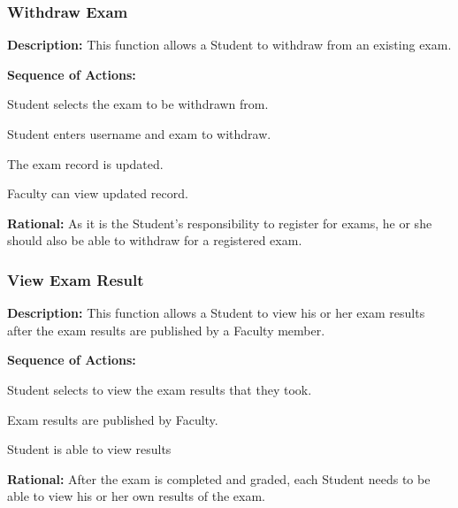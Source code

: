    \subsubsection{\large Withdraw Exam} 
   \begin{boxed} %
      \textbf{Description:}
      {\small This function allows a Student to withdraw from an existing exam.}
         
         \textbf{Sequence of Actions:}
         \begin{enumerate}
               {\small
            \item Student selects the exam to be withdrawn from.
            \item Student enters username and exam to withdraw.
            \item The exam record is updated.
            \item Faculty can view updated record.}
         \end{enumerate}

         \textbf{Rational:}
         {\small As it is the Student's responsibility to register for exams, he or she
         should also be able to withdraw for a registered exam.}
   \end{boxed} %

   \subsubsection{\large View Exam Result} 
   \begin{boxed} %
      \textbf{Description:}
      {\small This function allows a Student to view his or her exam results after
      the exam results are published by a Faculty member.}
         
         \textbf{Sequence of Actions:}
         \begin{enumerate}
               {\small
            \item Student selects to view the exam results that they took.
            \item Exam results are published by Faculty.
            \item Student is able to view results}
         \end{enumerate}

         \textbf{Rational:}
         {\small After the exam is completed and graded, each Student needs to
         be able to view his or her own results of the exam.}
   \end{boxed} %
